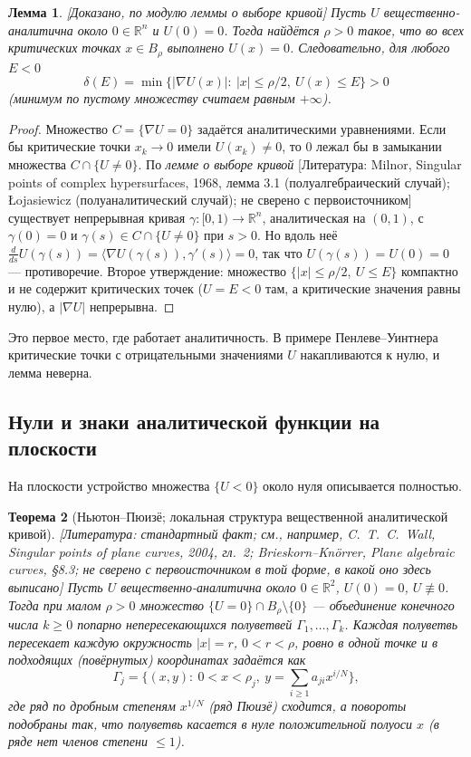 \documentclass[11pt,a4paper]{article}
\newtheorem{theorem}{Теорема}[section]
\newtheorem{lemma}[theorem]{Лемма}
\theoremstyle{definition}
\newcommand{\R}{\mathbb R}
\newcommand{\mk}[1]{\textsf{[#1]}}
\newcommand{\term}[1]{\emph{#1}}
\begin{document}
\begin{lemma}\label{lem:critval}
\mk{Доказано, по модулю леммы о выборе кривой} Пусть $U$ вещественно-аналитична около $0\in\R^n$
и $U(0)=0$. Тогда найдётся $\rho>0$ такое, что во всех критических точках $x\in B_\rho$
выполнено $U(x)=0$. Следовательно, для любого $E<0$
\[
\delta(E)=\min\{|\nabla U(x)|:\ |x|\le\rho/2,\ U(x)\le E\}>0
\]
(минимум по пустому множеству считаем равным $+\infty$).
\end{lemma}
\begin{proof}
Множество $C=\{\nabla U=0\}$ задаётся аналитическими уравнениями. Если бы критические точки
$x_k\to0$ имели $U(x_k)\ne0$, то $0$ лежал бы в замыкании множества $C\cap\{U\ne0\}$. По
\term{лемме о выборе кривой} \mk{Литература: Milnor, Singular points of complex hypersurfaces,
1968, лемма 3.1 (полуалгебраический случай); Łojasiewicz (полуаналитический случай); не сверено
с первоисточником} существует непрерывная кривая $\gamma\colon[0,1)\to\R^n$, аналитическая на
$(0,1)$, с $\gamma(0)=0$ и $\gamma(s)\in C\cap\{U\ne0\}$ при $s>0$. Но вдоль неё
$\frac{d}{ds}U(\gamma(s))=\langle\nabla U(\gamma(s)),\gamma'(s)\rangle=0$, так что
$U(\gamma(s))=U(0)=0$ --- противоречие. Второе утверждение: множество
$\{|x|\le\rho/2,\ U\le E\}$ компактно и не содержит критических точек ($U=E<0$ там, а критические
значения равны нулю), а $|\nabla U|$ непрерывна.
\end{proof}

Это первое место, где работает аналитичность. В примере Пенлеве--Уинтнера критические точки с
отрицательными значениями $U$ накапливаются к нулю, и лемма неверна.

\subsection{Нули и знаки аналитической функции на плоскости}\label{subsec:puiseux}

На плоскости устройство множества $\{U<0\}$ около нуля описывается полностью.

\begin{theorem}[Ньютон--Пюизё; локальная структура вещественной аналитической кривой]\label{thm:puiseux}
\mk{Литература: стандартный факт; см., например, C.~T.~C.~Wall, Singular points of plane curves,
2004, гл.~2; Brieskorn--Knörrer, Plane algebraic curves, §8.3; не сверено с первоисточником
в той форме, в какой оно здесь выписано} Пусть $U$ вещественно-аналитична около $0\in\R^2$,
$U(0)=0$, $U\not\equiv0$. Тогда при малом $\rho>0$ множество $\{U=0\}\cap B_\rho\setminus\{0\}$
--- объединение конечного числа $k\ge0$ попарно непересекающихся \term{полуветвей}
$\Gamma_1,\dots,\Gamma_k$. Каждая полуветвь пересекает каждую окружность $|x|=r$, $0<r<\rho$,
ровно в одной точке и в подходящих (повёрнутых) координатах задаётся как
\[
\Gamma_j=\{(x,y):\ 0<x<\rho_j,\ y=\textstyle\sum_{i\ge1}a_{ji}x^{i/N}\},
\]
где ряд по дробным степеням $x^{1/N}$ (\term{ряд Пюизё}) сходится, а повороты подобраны так, что
полуветвь касается в нуле положительной полуоси $x$ (в ряде нет членов степени $\le1$).
\end{theorem}
\end{document}
